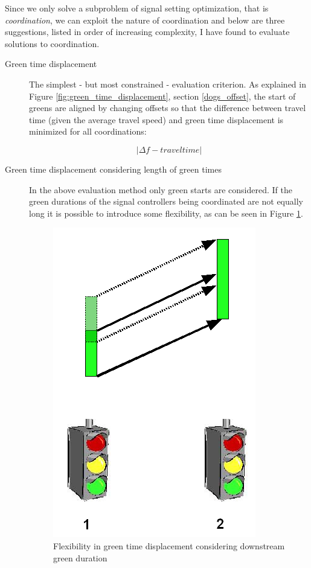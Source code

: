 Since we only solve a subproblem of signal setting optimization, that is \textit{coordination}, we can exploit the nature of coordination and below are three suggestions, listed in order of increasing complexity, I have found to evaluate solutions to coordination.

\begin{description}
\item[Green time displacement]
The simplest - but most constrained - evaluation criterion. As explained in Figure \ref{fig:green_time_displacement}, section \ref{dogs_offset}, the start of greens are aligned by changing offsets so that the difference between travel time (given the average travel speed) and green time displacement is minimized for all coordinations:

$$|\Delta f - traveltime|$$

\item[Green time displacement considering length of green times]
In the above evaluation method only green starts are considered. If the green durations of the signal controllers being coordinated are not equally long it is possible to introduce some flexibility, as can be seen in Figure \ref{fig:green_time_displacement_flex}.

\begin{figure}[htbp]
\centering
\includegraphics[scale=0.4]{green_time_displacement_flex.png}
\caption{Flexibility in green time displacement considering downstream green duration}
\label{fig:green_time_displacement_flex}
\end{figure}


\end{description}
